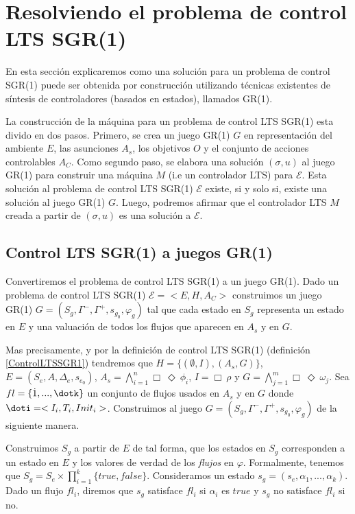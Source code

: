 \section{Resolviendo el problema de control LTS SGR(1)}

En esta sección explicaremos como una solución para un problema de control SGR(1) puede ser obtenida por construcción
utilizando técnicas existentes de síntesis de controladores (basados en estados), llamados GR(1). \cite{Piterman}

La construcción de la máquina para un problema de control LTS SGR(1) esta divido en dos pasos. Primero, se crea un juego GR(1)
$G$ en representación del ambiente $E$, las asunciones $A_s$, los objetivos $O$ y el conjunto de acciones controlables
$A_C$. Como segundo paso, se elabora una solución $(\sigma,u)$ al juego GR(1) para construir una máquina $M$ (i.e un
controlador LTS) para $\mathcal{E}$. Esta solución al problema de control LTS SGR(1) $\mathcal{E}$ existe, si y solo si,
existe una solución al juego GR(1) $G$. Luego, podremos afirmar que el controlador LTS $M$ creada a partir de
$(\sigma,u)$ es una solución a $\mathcal{E}$.

\subsection{Control LTS SGR(1) a juegos GR(1)}

Convertiremos el problema de control LTS SGR(1) a un juego GR(1). Dado un problema de control LTS SGR(1) $\mathcal{E} =
<E,H,A_C>$ construimos un juego GR(1) $G = (S_g,\Gamma^-,\Gamma^+,s_{g_0},\varphi_g)$ tal que cada estado en $S_g$
representa un estado en $E$ y una valuación de todos los flujos que aparecen en $A_s$ y en $G$.

Mas precisamente, y por la definición de control LTS SGR(1) (definición \ref{ControlLTSSGR1}) tendremos que $H =
\{(\emptyset,I),(A_s,G)\}$, $E = (S_e,A,\Delta_e,s_{e_0})$, $A_s = \bigwedge_{i=1}^n\Box\ \Diamond\ \phi_i$, $I = \Box\
\rho$ y $G = \bigwedge_{j=1}^m\Box\ \Diamond\ \omega_j$. Sea $fl = \{\dot1,...,\dotk\}$ un conjunto de flujos usados en
$A_s$ y en $G$ donde $\doti = <I_i,T_i,Init_i>$. Construimos al juego $G = (S_g,\Gamma^-,\Gamma^+,s_{g_0},\varphi_g)$ de
la siguiente manera.

Construimos $S_g$ a partir de $E$ de tal forma, que los estados en $S_g$ corresponden a un estado en $E$ y los valores
de verdad de los \emph{flujos} en $\varphi$. Formalmente, tenemos que  $S_g = S_e \times \prod_{i=1}^k\{true,false\}$.
Consideramos un estado $s_g = (s_e,\alpha_1,...,\alpha_k)$. Dado un flujo $fl_i$, diremos que $s_g$ satisface $fl_i$ si
$\alpha_i$ es $true$ y $s_g$ no satisface $fl_i$ si no. 

